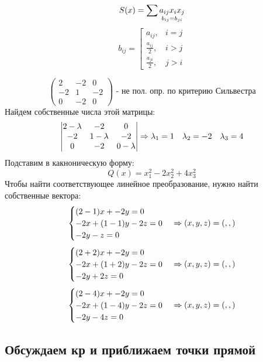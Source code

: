 \documentclass[12pt, fleqn]{article}
\begin{document}
    \begin{Reminder}
      \[S(x) = \sum \underset{b_{ij} = b_{ji}}{a_{ij} x_i x_j}\]
      \[b_{ij} = \left[\begin{matrix}
        a_{ij}, & i=j\\
        \frac{a_{ij}}{2}, & i > j\\
        \frac{a_{ji}}{2}, & j>i
      \end{matrix}\right.\]
    \end{Reminder}

    \begin{Sol}
      \[\begin{pmatrix}
        2 & -2 & 0\\
        -2 & 1 & -2\\
        0 & -2 & 0
      \end{pmatrix} \text{ - не пол. опр. по критерию Сильвестра}\]
      Найдем собственные числа этой матрицы:
      \[\begin{vmatrix}
        2 - \lambda & -2 & 0\\
        -2 & 1 - \lambda & -2\\
        0 & -2 & 0 - \lambda
      \end{vmatrix} \Rightarrow \lambda_1 = 1\quad \lambda_2 = -2\quad \lambda_3 = 4\]
      Подставим в какноническую форму:
      \[Q(x) = x_1^2 - 2x_2^2 + 4x_3^2\]
      Чтобы найти соответствующее линейное преобразование, нужно найти собственные вектора:
      \[\begin{cases}
        (2-1)x + -2y = 0\\
        -2x + (1-1)y -2z = 0\\
        -2y -z = 0
      \end{cases} \Rightarrow (x,y,z) = (,,)\]
      \[\begin{cases}
        (2+2)x + -2y = 0\\
        -2x + (1+2)y -2z = 0\\
        -2y +2z = 0
      \end{cases} \Rightarrow (x,y,z) = (,,)\]
      \[\begin{cases}
        (2-4)x + -2y = 0\\
        -2x + (1-4)y -2z = 0\\
        -2y - 4z = 0
      \end{cases} \Rightarrow (x,y,z) = (,,)\]
    \end{Sol}

    \subsection{Обсуждаем кр и приближаем точки прямой}
\end{document}

